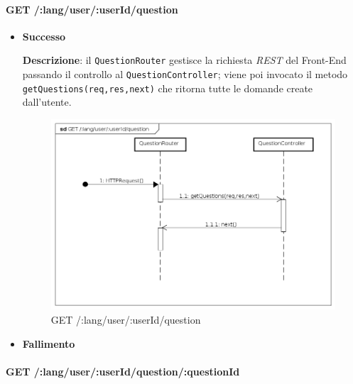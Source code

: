 
\paragraph{GET /:lang/user/:userId/question}
\begin{itemize}
\item \textbf{Successo}

\textbf{Descrizione}: il \texttt{QuestionRouter} gestisce la richiesta \textit{REST} del Front-End passando il controllo al \texttt{QuestionController}; viene poi invocato il metodo\\ \texttt{getQuestions(req,res,next)} che ritorna tutte le domande create dall'utente.

\begin{figure}[ht]
	\centering
	\includegraphics[scale=0.45]{UML/DiagrammiDiSequenza/Back-end/GET__lang_user__userId_question.png}
	\caption{GET /:lang/user/:userId/question}
\end{figure}
\FloatBarrier

\item \textbf{Fallimento}
\end{itemize}

\paragraph{GET /:lang/user/:userId/question/:questionId}


